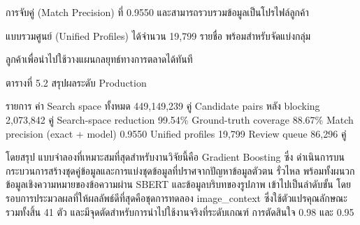 \documentclass[12pt,a4paper]{report}
\begin{document}
การจับคู่ (Match Precision) ที่ 0.9550 และสามารถรวบรวมข้อมูลเป็นโปรไฟล์ลูกค้า\par
\clearpage
แบบรวมศูนย์ (Unified Profiles) ได้จำนวน 19,799 รายชื่อ พร้อมสำหรับจัดแบ่งกลุ่ม\par
ลูกค้าเพื่อนำไปใช้วางแผนกลยุทธ์ทางการตลาดได้ทันที\par
\begin{center}\small ตารางที่ 5.2 สรุปผลระดับ Production\end{center}
รายการ ค่า Search space ทั้งหมด 449,149,239 คู่ Candidate pairs หลัง blocking 2,073,842 คู่ Search-space reduction 99.54\% Ground-truth coverage 88.67\% Match precision (exact + model) 0.9550 Unified profiles 19,799 Review queue 86,296 คู่\par
โดยสรุป แบบจำลองที่เหมาะสมที่สุดสำหรับงานวิจัยนี้คือ Gradient Boosting ซึ่ง ดำเนินการบนกระบวนการสร้างชุดคู่ข้อมูลและการแบ่งชุดข้อมูลที่ปราศจากปัญหาข้อมูลตัวตน รั่วไหล พร้อมทั้งผนวกข้อมูลเชิงความหมายของข้อความผ่าน SBERT และข้อมูลบริบทของรูปภาพ เข้าไปเป็นลำดับขั้น โดยรอบการประมวลผลที่ให้ผลลัพธ์ดีที่สุดคือชุดการทดลอง image\_context ซึ่งใช้ตัวแปรคุณลักษณะรวมทั้งสิ้น 41 ตัว และมีจุดตัดสำหรับการนำไปใช้งานจริงที่ระดับเกณฑ์ การตัดสินใจ 0.98 และ 0.95\par
\end{document}
